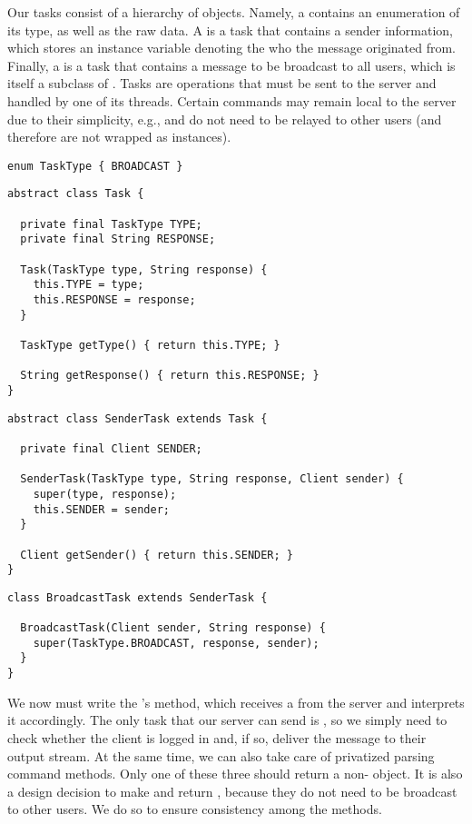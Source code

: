 Our tasks consist of a hierarchy of objects. 
Namely, a  contains an enumeration of its type, as well as the raw data. 
A  is a task that contains a sender information, which stores an instance variable denoting the  who the message originated from. 
Finally, a  is a task that contains a message to be broadcast to all users, which is itself a subclass of . 
Tasks are operations that must be sent to the server and handled by one of its threads. 
Certain commands may remain local to the server due to their simplicity, e.g.,  and  do not need to be relayed to other users (and therefore are not wrapped as  instances). 

\begin{lstlisting}[language=MyJava]
enum TaskType { BROADCAST }
\end{lstlisting}

\begin{lstlisting}[language=MyJava]
abstract class Task {

  private final TaskType TYPE;
  private final String RESPONSE;

  Task(TaskType type, String response) {
    this.TYPE = type;
    this.RESPONSE = response;
  }

  TaskType getType() { return this.TYPE; }

  String getResponse() { return this.RESPONSE; }
}
\end{lstlisting}

\begin{lstlisting}[language=MyJava]
abstract class SenderTask extends Task {

  private final Client SENDER;

  SenderTask(TaskType type, String response, Client sender) {
    super(type, response);
    this.SENDER = sender;
  }

  Client getSender() { return this.SENDER; }
}
\end{lstlisting}

\enlargethispage{-2\baselineskip}
\begin{lstlisting}[language=MyJava]
class BroadcastTask extends SenderTask {

  BroadcastTask(Client sender, String response) {
    super(TaskType.BROADCAST, response, sender);
  }
}
\end{lstlisting}

We now must write the 's  method, which receives a  from the server and interprets it accordingly. 
The only task that our server can send is , so we simply need to check whether the client is logged in and, if so, deliver the message to their output stream. 
At the same time, we can also take care of privatized parsing command methods. 
Only one of these three should return a non- object. 
It is also a design decision to make  and  return , because they do not need to be broadcast to other users. 
We do so to ensure consistency among the methods.

